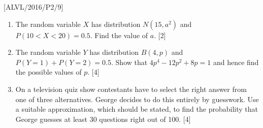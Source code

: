 \item {[}ALVL/2016/P2/9{]}
\begin{enumerate}
\item The random variable $X$ has distribution $N\left(15,a^{2}\right)$
and $P\left(10<X<20\right)=0.5$. Find the value of $a$. \hfill{}{[}2{]}
\item The random variable $Y$ has distribution $B\left(4,p\right)$ and
$P\left(Y=1\right)+P\left(Y=2\right)=0.5$. Show that $4p^{4}-12p^{2}+8p=1$
and hence find the possible values of $p$. \hfill{}{[}4{]}
\item On a television quiz show contestants have to select the right answer
from one of three alternatives. George decides to do this entirely
by guesswork. Use a suitable approximation, which should be stated,
to find the probability that George guesses at least 30 questions
right out of 100. \hfill{} {[}4{]}
\end{enumerate}
